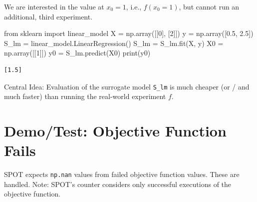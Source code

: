 \documentclass[
  letterpaper,
  DIV=11,
  numbers=noendperiod]{scrreprt}
\newenvironment{Shaded}{\begin{snugshade}}{\end{snugshade}}
\newcommand{\BuiltInTok}[1]{\textcolor[rgb]{0.00,0.23,0.31}{#1}}
\newcommand{\DecValTok}[1]{\textcolor[rgb]{0.68,0.00,0.00}{#1}}
\newcommand{\FloatTok}[1]{\textcolor[rgb]{0.68,0.00,0.00}{#1}}
\newcommand{\ImportTok}[1]{\textcolor[rgb]{0.00,0.46,0.62}{#1}}
\newcommand{\NormalTok}[1]{\textcolor[rgb]{0.00,0.23,0.31}{#1}}
\newcommand{\OperatorTok}[1]{\textcolor[rgb]{0.37,0.37,0.37}{#1}}
\begin{document}
We are interested in the value at \(x_0 = 1\), i.e., \(f(x_0 = 1)\), but
cannot run an additional, third experiment.

\begin{Shaded}
\begin{Highlighting}[]
\ImportTok{from}\NormalTok{ sklearn }\ImportTok{import}\NormalTok{ linear\_model}
\NormalTok{X }\OperatorTok{=}\NormalTok{ np.array([[}\DecValTok{0}\NormalTok{], [}\DecValTok{2}\NormalTok{]])}
\NormalTok{y }\OperatorTok{=}\NormalTok{ np.array([}\FloatTok{0.5}\NormalTok{, }\FloatTok{2.5}\NormalTok{])}
\NormalTok{S\_lm }\OperatorTok{=}\NormalTok{ linear\_model.LinearRegression()}
\NormalTok{S\_lm }\OperatorTok{=}\NormalTok{ S\_lm.fit(X, y)}
\NormalTok{X0 }\OperatorTok{=}\NormalTok{ np.array([[}\DecValTok{1}\NormalTok{]])}
\NormalTok{y0 }\OperatorTok{=}\NormalTok{ S\_lm.predict(X0)}
\BuiltInTok{print}\NormalTok{(y0)}
\end{Highlighting}
\end{Shaded}

\begin{verbatim}
[1.5]
\end{verbatim}

Central Idea: Evaluation of the surrogate model \texttt{S\_lm} is much
cheaper (or / and much faster) than running the real-world experiment
\(f\).

\section{Demo/Test: Objective Function
Fails}\label{demotest-objective-function-fails}

SPOT expects \texttt{np.nan} values from failed objective function
values. These are handled. Note: SPOT's counter considers only
successful executions of the objective function.
\end{document}
